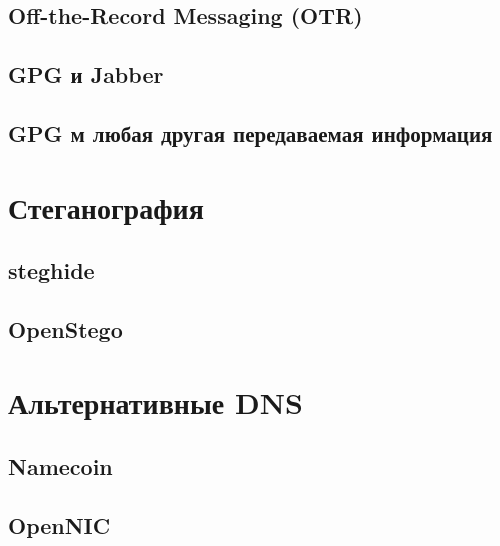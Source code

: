 \subsection{Off-the-Record Messaging (OTR)}
\subsection{GPG и Jabber}
\subsection{GPG м любая другая передаваемая информация}

\section{Стеганография}
\subsection{steghide}
\subsection{OpenStego}

\section{Альтернативные DNS}
\subsection{Namecoin}
\subsection{OpenNIC}